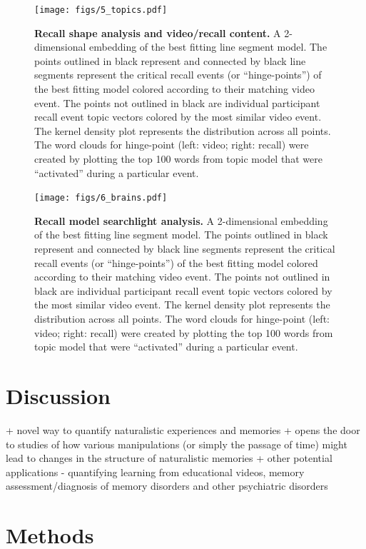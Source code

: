 \documentclass{article}
\begin{document}
{\begin{figure}[t!]
\centering
\texttt{[image: figs/5\_topics.pdf]}
\caption{\small \textbf{Recall shape analysis and video/recall content.} A 2-dimensional embedding of the best fitting line segment model.  The points outlined in black represent and connected by black line segments represent the critical recall events (or ``hinge-points'') of the best fitting model colored according to their matching video event.  The points not outlined in black are individual participant recall event topic vectors colored by the most similar video event. The kernel density plot represents the distribution across all points.  The word clouds for hinge-point (left: video; right: recall) were created by plotting the top 100 words from topic model that were ``activated'' during a particular event.}
\label{fig:topics}
\end{figure}

\begin{figure}[]
\centering
\texttt{[image: figs/6\_brains.pdf]}
\caption{\small \textbf{Recall model searchlight analysis.} A 2-dimensional embedding of the best fitting line segment model.  The points outlined in black represent and connected by black line segments represent the critical recall events (or ``hinge-points'') of the best fitting model colored according to their matching video event.  The points not outlined in black are individual participant recall event topic vectors colored by the most similar video event. The kernel density plot represents the distribution across all points.  The word clouds for hinge-point (left: video; right: recall) were created by plotting the top 100 words from topic model that were ``activated'' during a particular event.}
\label{fig:topics}
\end{figure}


\section{Discussion}
\label{sec:discussion}

+ novel way to quantify naturalistic experiences and memories
+ opens the door to studies of how various manipulations (or simply the passage of time) might lead to changes in the structure of naturalistic memories
+ other potential applications - quantifying learning from educational videos, memory assessment/diagnosis of memory disorders and other psychiatric disorders

\section{Methods}
\label{sec:methods}

}
\end{document}
